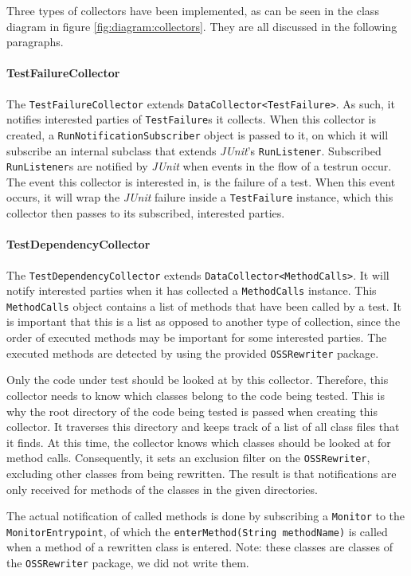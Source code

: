 \documentclass[i2]{oss}
\newcommand{\class}[1]{\texttt{#1}}
\newcommand{\method}[1]{\texttt{#1}}
\newcommand{\junit}{\emph{JUnit }}
\begin{document}
Three types of collectors have been implemented, as can be seen in the class diagram in figure \ref{fig:diagram:collectors}.
They are all discussed in the following paragraphs.

\paragraph{TestFailureCollector} The \class{TestFailureCollector} extends \class{DataCollector<TestFailure>}.
As such, it notifies interested parties of \class{TestFailure}s it collects.
When this collector is created, a \class{RunNotificationSubscriber} object is passed to it, on which it will subscribe an internal subclass that extends \emph{JUnit}'s \class{RunListener}.
Subscribed \class{RunListener}s are notified by \junit when events in the flow of a testrun occur.
The event this collector is interested in, is the failure of a test.
When this event occurs, it will wrap the \junit failure inside a \class{TestFailure} instance, which this collector then passes to its subscribed, interested parties.

\paragraph{TestDependencyCollector} The \class{TestDependencyCollector} extends \class{DataCollector<MethodCalls>}.
It will notify interested parties when it has collected a \class{MethodCalls} instance.
This \class{MethodCalls} object contains a list of methods that have been called by a test.
It is important that this is a list as opposed to another type of collection, since the order of executed methods may be important for some interested parties.
The executed methods are detected by using the provided \class{OSSRewriter} package.

Only the code under test should be looked at by this collector.
Therefore, this collector needs to know which classes belong to the code being tested.
This is why the root directory of the code being tested is passed when creating this collector.
It traverses this directory and keeps track of a list of all class files that it finds.
At this time, the collector knows which classes should be looked at for method calls. Consequently, it sets an exclusion filter on the \class{OSSRewriter}, excluding other classes from being rewritten. The result is that notifications are only received for methods of the classes in the given directories.

The actual notification of called methods is done by subscribing a \class{Monitor} to the \class{MonitorEntrypoint}, of which the \method{enterMethod(String methodName)} is called when a method of a rewritten class is entered. Note: these classes are classes of the \class{OSSRewriter} package, we did not write them.
\end{document}
